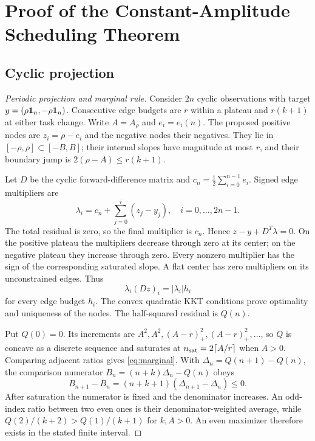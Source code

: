\section{Proof of the Constant-Amplitude Scheduling Theorem}
\subsection{Cyclic projection}
\begin{proof}[Periodic projection and marginal rule]
Consider $2n$ cyclic observations with target $y=(\rho\mathbf 1_n,-\rho\mathbf 1_n)$. Consecutive edge budgets are $r$ within a plateau and $r(k+1)$ at either task change. Write $A=A_\rho$ and $e_i=e_i(n)$. The proposed positive nodes are $z_i=\rho-e_i$ and the negative nodes their negatives. They lie in $[-\rho,\rho]\subset[-B,B]$; their internal slopes have magnitude at most $r$, and their boundary jump is $2(\rho-A)\le r(k+1)$.

Let $D$ be the cyclic forward-difference matrix and $c_n=\frac12\sum_{i=0}^{n-1}e_i$. Signed edge multipliers are
\begin{equation}
 \lambda_i=c_n+\sum_{j=0}^i(z_j-y_j),\quad i=0,\ldots,2n-1.
\end{equation}
The total residual is zero, so the final multiplier is $c_n$. Hence $z-y+D^T\lambda=0$. On the positive plateau the multipliers decrease through zero at its center; on the negative plateau they increase through zero. Every nonzero multiplier has the sign of the corresponding saturated slope. A flat center has zero multipliers on its unconstrained edges. Thus
\begin{equation}
 \lambda_i(Dz)_i=|\lambda_i|h_i
\end{equation}
for every edge budget $h_i$. The convex quadratic KKT conditions prove optimality and uniqueness of the nodes. The half-squared residual is $Q(n)$.

Put $Q(0)=0$. Its increments are $A^2,A^2,(A-r)_+^2,(A-r)_+^2,\ldots$, so $Q$ is concave as a discrete sequence and saturates at $n_{\rm sat}=2\lceil A/r\rceil$ when $A>0$. Comparing adjacent ratios gives \eqref{eq:marginal}. With $\Delta_n=Q(n+1)-Q(n)$, the comparison numerator $B_n=(n+k)\Delta_n-Q(n)$ obeys
\begin{equation}
 B_{n+1}-B_n=(n+k+1)(\Delta_{n+1}-\Delta_n)\le0.
\end{equation}
After saturation the numerator is fixed and the denominator increases. An odd-index ratio between two even ones is their denominator-weighted average, while $Q(2)/(k+2)>Q(1)/(k+1)$ for $k,A>0$. An even maximizer therefore exists in the stated finite interval.
\end{proof}

